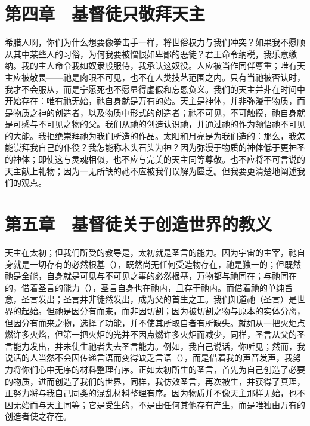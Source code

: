 
\section{第四章　基督徒只敬拜天主}

希腊人啊，你们为什么想要像拳击手一样，将世俗权力与我们冲突？如果我不愿顺从其中某些人的习俗，为何我要被憎恨如卑鄙的恶徒？君王命令纳税，我乐意缴纳。我的主人命令我如奴隶般服侍，我承认这奴役。人应被当作同伴尊重；唯有天主应被敬畏——祂是肉眼不可见，也不在人类技艺范围之内。只有当祂被否认时，我才不会服从，而是宁愿死也不愿显得虚假和忘恩负义。我们的天主并非在时间中开始存在：唯有祂无始，祂自身就是万有的始。天主是神体，并非弥漫于物质，而是物质之神的创造者，以及物质中形式的创造者；祂不可见，不可触摸，祂自身就是可感与不可见之物的父。我们从祂的创造认识祂，并通过祂的作为领悟祂不可见的大能。我拒绝崇拜祂为我们所造的作品。太阳和月亮是为我们造的：那么，我怎能崇拜我自己的仆役？我怎能称木头石头为神？因为弥漫于物质的神体低于更神圣的神体；即使这与灵魂相似，也不应与完美的天主同等尊敬。也不应将不可言说的天主献上礼物；因为一无所缺的祂不应被我们误解为匮乏。但我要更清楚地阐述我们的观点。\par


\section{第五章　基督徒关于创造世界的教义}

天主在太初；但我们所受的教导是，太初就是圣言的能力。因为宇宙的主宰，祂自身就是一切存有的必然根基（），既然尚无任何受造物存在，祂是独一的；但既然祂是全能，自身就是可见与不可见之事的必然根基，万物都与祂同在；与祂同在的，借着圣言的能力（），圣言自身也在祂内，且存于祂内。而借着祂的单纯旨意，圣言发出；圣言并非徒然发出，成为父的首生之工。我们知道祂（圣言）是世界的起始。但祂是因分有而来，而非因切割；因为被切割之物与原本的实体分离，但因分有而来之物，选择了功能，并不使其所取自者有所缺失。就如从一把火炬点燃许多火焰，但第一把火炬的光并不因点燃许多火炬而减少，同样，圣言从父的圣言能力发出，并未使生祂者失去圣言能力。例如，我自己说话，你听见；然而，我说话的人当然不会因传递言语而变得缺乏言语（），而是借着我的声音发声，我努力将你们心中无序的材料整理有序。正如太初所生的圣言，首先为自己创造了必要的物质，进而创造了我们的世界，同样，我仿效圣言，再次被生，并获得了真理，正努力将与我自己同类的混乱材料整理有序。因为物质并不像天主那样无始，也不因无始而与天主同等；它是受生的，不是由任何其他存有产生，而是唯独由万有的创造者使之存在。\par

